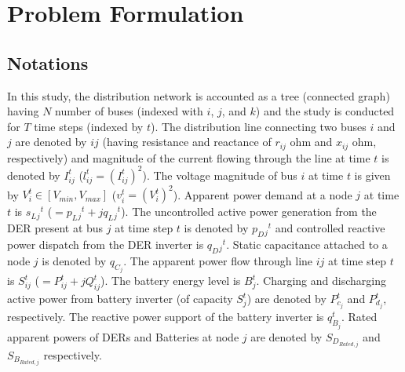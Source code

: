 \documentclass{article}
\begin{document}
\section{Problem Formulation}

\subsection{Notations}
In this study, the distribution network is accounted as a tree (connected graph) having \(N\) number of buses (indexed with \(i\), \(j\), and \(k\)) and the study is conducted for \(T\) time steps (indexed by \(t\)). The distribution line connecting two buses \(i\) and \(j\) are denoted by {\(ij\)} (having resistance and reactance of \(r_{ij}\) ohm and \(x_{ij}\) ohm, respectively) and magnitude of the current flowing through the line at time \(t\) is denoted by \(I_{ij}^t\) (\(l_{ij}^t=\left(I_{ij}^t\right)^2\)). The voltage magnitude of bus \(i\) at time \(t\) is given by \(V_i^t \in [V_{min},V_{max}]\) (\(v_i^t=\left(V_i^t\right)^2\)). Apparent power demand at a node \(j\) at time \(t\) is \(s_L{_j}^t\) (\(=p_L{_j}^t+\textit{j}q_L{_j}^t\)). The uncontrolled active power generation from the DER present at bus \(j\) at time step \(t\) is denoted by \(p_D{_j}^t\) and controlled reactive power dispatch from the DER inverter is \(q_D{_j}^t\). Static capacitance attached to a node $j$ is denoted by $q_{C_{j}}$. The apparent power flow through line {\(ij\)} at time step \(t\) is \(S_{ij}^t\) (\(=P_{ij}^t+\textit{j}Q_{ij}^t\)). The battery energy level is \(B_j^t\). Charging and discharging active power from battery inverter (of capacity \(S_j^t\)) are denoted by \(P_{c_j}^t\) and \(P_{d_j}^t\), respectively. The reactive power support of the battery inverter is \(q_{B_j}^t\). Rated apparent powers of DERs and Batteries at node $j$ are denoted by $S_{D_{Rated, j}}$ and $S_{B_{Rated, j}}$ respectively.
\end{document}

